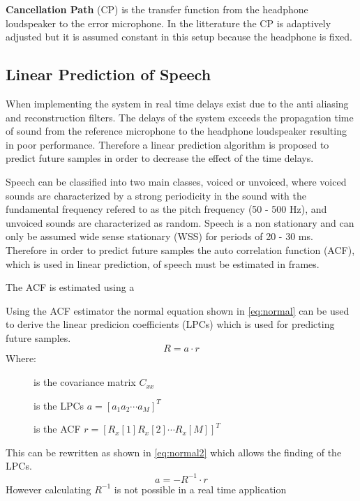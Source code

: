 \textbf{Cancellation Path} (CP) is the transfer function from the headphone loudspeaker to the error microphone. In the litterature \cite{Hansen} the CP is adaptively adjusted but it is assumed constant in this setup because the headphone is fixed.     


\subsection*{Linear Prediction of Speech}
When implementing the system in real time delays exist due to the anti aliasing and reconstruction filters. The delays of the system exceeds the propagation time of sound from the reference microphone to the headphone loudspeaker resulting in poor performance. Therefore a linear prediction algorithm is proposed to predict future samples in order to decrease the effect of the time delays.


Speech can be classified into two main classes, voiced or unvoiced, where voiced sounds are characterized by a strong periodicity in the sound with the fundamental frequency refered to as the pitch frequency (50 - 500 Hz), and unvoiced sounds are characterized as random. Speech is a non stationary and can only be assumed wide sense stationary (WSS) for periods of 20 - 30 ms. Therefore in order to predict future samples the auto correlation function (ACF), which is used in linear prediction, of speech must be estimated in frames. 

The ACF is estimated using a   

Using the ACF estimator the normal equation shown in \autoref{eq:normal} can be used to derive the linear predicion coefficients (LPCs) which is used for predicting future samples. 
\begin{equation}\label{eq:normal}
R = a\cdot r
\end{equation}
Where:
\begin{description}
	\item[] is the covariance matrix $C_{xx}$
	\item[] is the LPCs $a = [a_1 a_2 \cdots a_M]^T$
	\item[] is the ACF $r = [R_x[1] R_x[2] \cdots R_x[M]]^T$
\end{description}
This can be rewritten as shown in \autoref{eq:normal2} which allows the finding of the LPCs.  
 \begin{equation}\label{eq:normal2}
a = -R^{-1}\cdot r
\end{equation}
However calculating $R^{-1}$ is not possible in a real time application 




